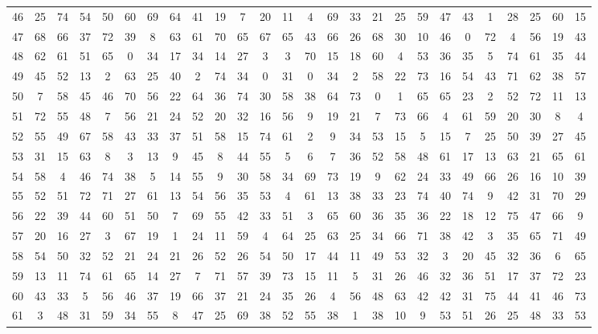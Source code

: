 \begin{table}
\begin{tabular}{c c c c c c c c c c c c c c c c c c c c c c c c c c }
46 & 25 & 74 & 54 & 50 & 60 & 69 & 64 & 41 & 19 & 7 & 20 & 11 & 4 & 69 & 33 & 21 & 25 & 59 & 47 & 43 & 1 & 28 & 25 & 60 & 15 \\
47 & 68 & 66 & 37 & 72 & 39 & 8 & 63 & 61 & 70 & 65 & 67 & 65 & 43 & 66 & 26 & 68 & 30 & 10 & 46 & 0 & 72 & 4 & 56 & 19 & 43 \\
48 & 62 & 61 & 51 & 65 & 0 & 34 & 17 & 34 & 14 & 27 & 3 & 3 & 70 & 15 & 18 & 60 & 4 & 53 & 36 & 35 & 5 & 74 & 61 & 35 & 44 \\
49 & 45 & 52 & 13 & 2 & 63 & 25 & 40 & 2 & 74 & 34 & 0 & 31 & 0 & 34 & 2 & 58 & 22 & 73 & 16 & 54 & 43 & 71 & 62 & 38 & 57 \\
50 & 7 & 58 & 45 & 46 & 70 & 56 & 22 & 64 & 36 & 74 & 30 & 58 & 38 & 64 & 73 & 0 & 1 & 65 & 65 & 23 & 2 & 52 & 72 & 11 & 13 \\
51 & 72 & 55 & 48 & 7 & 56 & 21 & 24 & 52 & 20 & 32 & 16 & 56 & 9 & 19 & 21 & 7 & 73 & 66 & 4 & 61 & 59 & 20 & 30 & 8 & 4 \\
52 & 55 & 49 & 67 & 58 & 43 & 33 & 37 & 51 & 58 & 15 & 74 & 61 & 2 & 9 & 34 & 53 & 15 & 5 & 15 & 7 & 25 & 50 & 39 & 27 & 45 \\
53 & 31 & 15 & 63 & 8 & 3 & 13 & 9 & 45 & 8 & 44 & 55 & 5 & 6 & 7 & 36 & 52 & 58 & 48 & 61 & 17 & 13 & 63 & 21 & 65 & 61 \\
54 & 58 & 4 & 46 & 74 & 38 & 5 & 14 & 55 & 9 & 30 & 58 & 34 & 69 & 73 & 19 & 9 & 62 & 24 & 33 & 49 & 66 & 26 & 16 & 10 & 39 \\
55 & 52 & 51 & 72 & 71 & 27 & 61 & 13 & 54 & 56 & 35 & 53 & 4 & 61 & 13 & 38 & 33 & 23 & 74 & 40 & 74 & 9 & 42 & 31 & 70 & 29 \\
56 & 22 & 39 & 44 & 60 & 51 & 50 & 7 & 69 & 55 & 42 & 33 & 51 & 3 & 65 & 60 & 36 & 35 & 36 & 22 & 18 & 12 & 75 & 47 & 66 & 9 \\
57 & 20 & 16 & 27 & 3 & 67 & 19 & 1 & 24 & 11 & 59 & 4 & 64 & 25 & 63 & 25 & 34 & 66 & 71 & 38 & 42 & 3 & 35 & 65 & 71 & 49 \\
58 & 54 & 50 & 32 & 52 & 21 & 24 & 21 & 26 & 52 & 26 & 54 & 50 & 17 & 44 & 11 & 49 & 53 & 32 & 3 & 20 & 45 & 32 & 36 & 6 & 65 \\
59 & 13 & 11 & 74 & 61 & 65 & 14 & 27 & 7 & 71 & 57 & 39 & 73 & 15 & 11 & 5 & 31 & 26 & 46 & 32 & 36 & 51 & 17 & 37 & 72 & 23 \\
60 & 43 & 33 & 5 & 56 & 46 & 37 & 19 & 66 & 37 & 21 & 24 & 35 & 26 & 4 & 56 & 48 & 63 & 42 & 42 & 31 & 75 & 44 & 41 & 46 & 73 \\
61 & 3 & 48 & 31 & 59 & 34 & 55 & 8 & 47 & 25 & 69 & 38 & 52 & 55 & 38 & 1 & 38 & 10 & 9 & 53 & 51 & 26 & 25 & 48 & 33 & 53 \\

\end{tabular}
\end{table}
